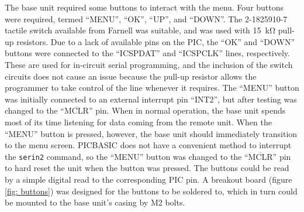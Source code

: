 The base unit required some buttons to interact with the menu. Four buttons were required, termed ``MENU'', ``OK'', ``UP'', and ``DOWN''. The 2-1825910-7 tactile switch \cite{buttons} available from Farnell was suitable, and was used with \SI{15}{\kilo\ohm} pull-up resistors. Due to a lack of available pins on the PIC, the ``OK'' and ``DOWN'' buttons were connected to the ``ICSPDAT'' and ``ICSPCLK'' lines, respectively. These are used for in-circuit serial programming, and the inclusion of the switch circuits does not cause an issue because the pull-up resistor allows the programmer to take control of the line whenever it requires. The ``MENU'' button was initially connected to an external interrupt pin ``INT2'', but after testing was changed to the ``$\overline{\text{MCLR}}$'' pin. When in normal operation, the base unit spends most of its time listening for data coming from the remote unit. When the ``MENU'' button is pressed, however, the base unit should immediately transition to the menu screen. PICBASIC does not have a convenient method to interrupt the \verb|serin2| command, so the ``MENU'' button was changed to the ``$\overline{\text{MCLR}}$'' pin to hard reset the unit when the button was pressed. The buttons could be read by a simple digital read to the corresponding PIC pin. A breakout board (figure \ref{fig: buttons}) was designed for the buttons to be soldered to, which in turn could be mounted to the base unit's casing by M2 bolts.\\









